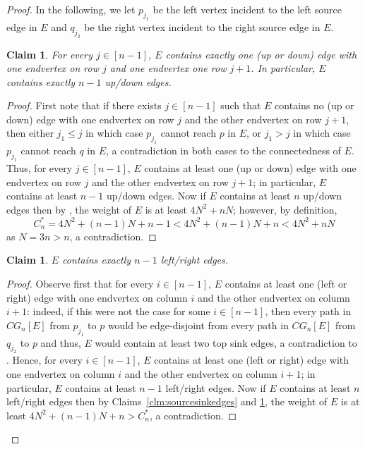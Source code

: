 \documentclass[a4paper,11pt]{article}
\theoremstyle{plain}
\newtheorem{claim}[theorem]{Claim}
\newtheorem{identification rule}{Identification Rule}
\theoremstyle{definition}
\theoremstyle{remark}
\newenvironment{claimproof}{\begin{proof}\renewcommand{\qedsymbol}{\claimqed}}{\end{proof}\renewcommand{\qedsymbol}{\plainqed}}
\let\plainqed\qedsymbol
\newcommand{\claimqed}{$\lrcorner$}
\begin{document}
\begin{proof}
In the following, we let $p_{j_1}$ be the left vertex incident to the left source edge in $E$ and $q_{j_2}$ be the right vertex incident to the right source edge in $E$.

\begin{claim}
\label{clm:updownedges}
For every $j \in [n-1]$, $E$ contains exactly one (up or down) edge with one endvertex on row $j$ and one endvertex one row $j+1$. In particular, $E$ contains exactly $n-1$ up/down edges.
\end{claim}

\begin{claimproof}
First note that if there exists $j \in [n-1]$ such that $E$ contains no (up or down) edge with one endvertex on row $j$ and the other endvertex on row $j+1$, then either $j_1 \leq j$ in which case $p_{j_1}$ cannot reach $p$ in $E$, or $j_1 > j$ in which case $p_{j_1}$ cannot reach $q$ in $E$, a contradiction in both cases to the connectedness of $E$. Thus, for every $j \in [n-1]$, $E$ contains at least one (up or down) edge with one endvertex on row $j$ and the other endvertex on row $j+1$; in particular, $E$ contains at least $n-1$ up/down edges. Now if $E$ contains at least $n$ up/down edges then by , the weight of $E$ is at least $4N^2 + nN$; however, by definition, 
\[
C_n^* = 4N^2 + (n-1)N + n-1 < 4N^2 + (n-1)N + n < 4N^2 + nN
\]
as $N = 3n > n$, a contradiction.
\end{claimproof}

\begin{claim}
\label{clm:leftrightedges}
$E$ contains exactly $n-1$ left/right edges.
\end{claim}

\begin{claimproof}
Observe first that for every $i \in [n-1]$, $E$ contains at least one (left or right) edge with one endvertex on column $i$ and the other endvertex on column $i+1$: indeed, if this were not the case for some $i \in [n-1]$, then every path in $CG_n[E]$ from $p_{j_1}$ to $p$ would be edge-disjoint from every path in $CG_n[E]$ from $q_{j_2}$ to $p$ and thus, $E$ would contain at least two top sink edges, a contradiction to . Hence, for every $i \in [n-1]$, $E$ contains at least one (left or right) edge with one endvertex on column $i$ and the other endvertex on column $i+1$; in particular, $E$ contains at least $n-1$ left/right edges. Now if $E$ contains at least $n$ left/right edges then by Claims~\ref{clm:sourcesinkedges} and \ref{clm:updownedges}, the weight of $E$ is at least $4N^2 + (n-1)N + n > C_n^*$, a contradiction.
\end{claimproof}


\end{proof}
\end{document}
